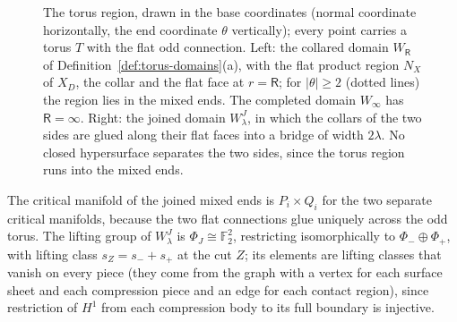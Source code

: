 \documentclass[11pt]{amsart}
\theoremstyle{definition}
\theoremstyle{remark}
\theoremstyle{plain}
\numberwithin{equation}{section}
\newcommand{\FF}{\mathbb{F}_2}
\begin{document}
\begin{figure}[ht]
\centering
{}
\caption{The torus region, drawn in the base coordinates (normal coordinate
horizontally, the end coordinate $\theta$ vertically); every point carries a torus
$T$ with the flat odd connection. Left: the collared domain $W_\mathsf R$ of
Definition~\ref{def:torus-domains}(a), with the flat product region $N_X$ of $X_D$, the
collar and the flat face at $r=\mathsf R$; for $|\theta|\ge2$ (dotted lines) the region lies in
the mixed ends. The completed domain $W_\infty$ has $\mathsf R=\infty$. Right: the joined
domain $W^J_\lambda$, in which the collars of the two sides are glued along their flat
faces into a bridge of width $2\lambda$. No closed hypersurface separates the two
sides, since the torus region runs into the mixed ends.}
\label{fig:torus-domains}
\end{figure}


The critical manifold of the joined mixed ends is $P_i\times Q_i$ for the two
separate critical manifolds, because the two flat connections glue uniquely
across the odd torus. The lifting group of $W^J_\lambda$ is $\Phi_J\cong\FF^2$,
restricting isomorphically to $\Phi_-\oplus\Phi_+$, with lifting class $s_Z=s_-+s_+$
at the cut $Z$; its elements are lifting classes that vanish on every piece (they come from the graph with a vertex for each surface sheet and each compression piece and an edge for each contact region), since
restriction of $H^1$ from each compression body to its full boundary is
injective.
\end{document}
